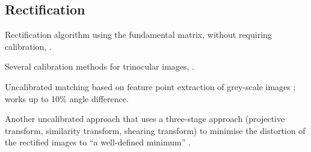 \subsection{Rectification}
\label{sec:rectification-prior}

Rectification algorithm using the fundamental matrix, without requiring
calibration, \cite{chen03}.

Several calibration methods for trinocular images, \cite{sun03:_uncal}.

Uncalibrated matching based on feature point extraction of grey-scale images
\cite{papadimitriou96:_epipol}; works up to 10\% angle difference.

Another uncalibrated approach that uses a three-stage approach (projective
transform, similarity transform, shearing transform) to minimise the distortion
of the rectified images to ``a well-defined minimum'' \cite{loop99:_comput}.
